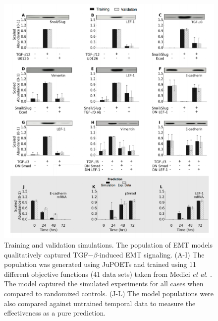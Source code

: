 \documentclass[12pt]{article}
\begin{document}
\begin{figure}
\includegraphics [width=1.0\linewidth] {./figs/Fig2_training.pdf}
\caption{Training and validation simulations. The population of EMT models qualitatively captured TGF$-\beta$-induced EMT signaling.
(A-I) The population was generated using JuPOETs and trained using 11 different objective functions (41 data sets) taken from Medici \emph{et al.} \citep{Medici:2008fk}.
The model captured the simulated experiments for all cases when compared to randomized controls.
(J-L)  The model populations were also compared against untrained temporal data to measure the effectiveness as a pure prediction.}\label{fg:F2}
\end{figure}

\clearpage
\end{document}
